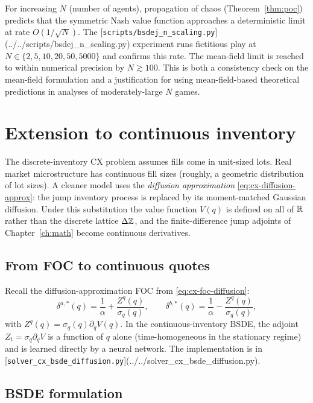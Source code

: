 For increasing $N$ (number of agents), propagation of chaos (Theorem~\ref{thm:poc}) predicts that the symmetric Nash value function approaches a deterministic limit at rate $O(1/\sqrt{N})$. The [\texttt{scripts/bsdej\_n\_scaling.py}](../../scripts/bsdej_n_scaling.py) experiment runs fictitious play at $N \in \{2, 5, 10, 20, 50, 5000\}$ and confirms this rate. The mean-field limit is reached to within numerical precision by $N \gtrsim 100$. This is both a consistency check on the mean-field formulation and a justification for using mean-field-based theoretical predictions in analyses of moderately-large $N$ games.

\section{Extension to continuous inventory}
\label{sec:continuous-inventory}

The discrete-inventory CX problem assumes fills come in unit-sized lots. Real market microstructure has continuous fill sizes (roughly, a geometric distribution of lot sizes). A cleaner model uses the \emph{diffusion approximation} \eqref{eq:cx-diffusion-approx}: the jump inventory process is replaced by its moment-matched Gaussian diffusion. Under this substitution the value function $V(q)$ is defined on all of $\mathbb{R}$ rather than the discrete lattice $\Delta \mathbb{Z}$, and the finite-difference jump adjoints of Chapter~\ref{ch:math} become continuous derivatives.

\subsection{From FOC to continuous quotes}

Recall the diffusion-approximation FOC from \eqref{eq:cx-foc-diffusion}:
\begin{equation}
  \delta^{a,*}(q) = \frac{1}{\alpha} + \frac{Z^q(q)}{\sigma_q(q)}, \qquad \delta^{b,*}(q) = \frac{1}{\alpha} - \frac{Z^q(q)}{\sigma_q(q)},
\end{equation}
with $Z^q(q) = \sigma_q(q) \partial_q V(q)$. In the continuous-inventory BSDE, the adjoint $Z_t = \sigma_q \partial_q V$ is a function of $q$ alone (time-homogeneous in the stationary regime) and is learned directly by a neural network. The implementation is in [\texttt{solver\_cx\_bsde\_diffusion.py}](../../solver_cx_bsde_diffusion.py).

\subsection{BSDE formulation}


